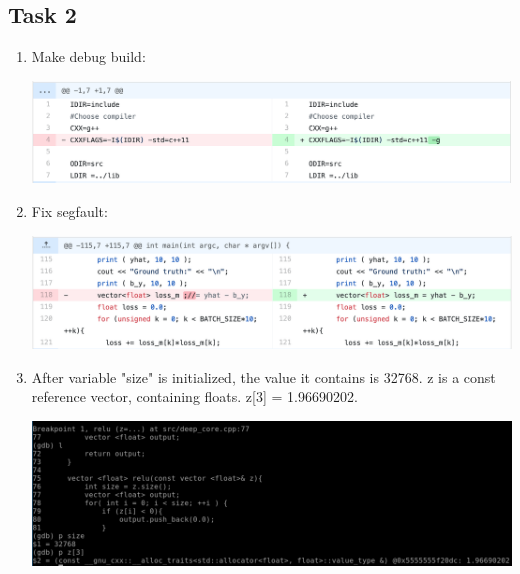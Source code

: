 \documentclass[a4paper, DIV12, headsepline]{scrartcl}
\begin{document}
\subsection*{Task 2}
\begin{enumerate}[label=(\alph*)]
\item Make debug build:
\begin{center}
\includegraphics[scale=0.25]{task2.1.png}
\end{center}

\item Fix segfault:
\begin{center}
\includegraphics[scale=0.25]{task2.2.png}
\end{center}

\item After variable "size" is initialized, the value it contains is 32768. z is a const reference vector, containing floats.  z[3] = 1.96690202.
\begin{center}
	\includegraphics[scale=0.3]{task2.3.png}
\end{center}
\end{enumerate}
\end{document}
